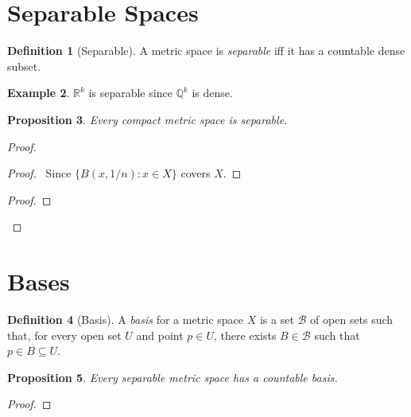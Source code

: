 \documentclass{book}
\let\qed\relax
\newtheorem{prop}{Proposition}[chapter]
\theoremstyle{definition}
\newtheorem{df}[prop]{Definition}
\newtheorem{ex}[prop]{Example}
\begin{document}
\section{Separable Spaces}

\begin{df}[Separable]
A metric space is \emph{separable} iff it has a countable dense subset.
\end{df}

\begin{ex}
$\mathbb{R}^k$ is separable since $\mathbb{Q}^k$ is dense.
\end{ex}

\begin{prop}
Every compact metric space is separable.
\end{prop}

\begin{proof}
\pf
{}
\begin{proof}
	\pf\ Since $\{ B(x, 1/n) : x \in X \}$ covers $X$.
\end{proof}
\begin{proof}
\end{proof}
\qed
\end{proof}

\section{Bases}

\begin{df}[Basis]
A \emph{basis} for a metric space $X$ is a set $\mathcal{B}$ of open sets such that, for every open set $U$ and point $p \in U$, there exists $B \in \mathcal{B}$ such that $p \in B \subseteq U$.
\end{df}

\begin{prop}
Every separable metric space has a countable basis.
\end{prop}

\begin{proof}
\pf
{}
\qed
\end{proof}
\end{document}
